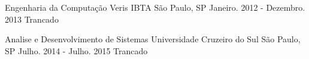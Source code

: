 

\begin{cventries}

  \cventry
    {Engenharia da Computação} %
    {Veris IBTA} %
    {São Paulo, SP} %
    {Janeiro. 2012 - Dezembro. 2013 \newline Trancado} %
    {
    }

\cventry
  {Analise e Desenvolvimento de Sistemas} %
  {Universidade Cruzeiro do Sul} %
  {São Paulo, SP} %
  {Julho. 2014 - Julho. 2015 \newline Trancado} %
  {
  }

\end{cventries}
